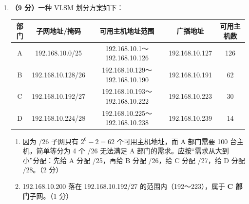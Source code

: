 \documentclass[a4paper,11pt]{article}
\begin{document}
\begin{enumerate}[start=13, label=\textbf{\arabic*.}, leftmargin=2.4em, itemsep=0.45em]
\item \textbf{（9 分）}一种 VLSM 划分方案如下：
\begin{center}\small
\begin{tabular}{ccccc}
\toprule
部门 & 子网地址/掩码 & 可用主机地址范围 & 广播地址 & 可用主机数 \\
\midrule
A & 192.168.10.0/25 & 192.168.10.1～192.168.10.126 & 192.168.10.127 & 126 \\
B & 192.168.10.128/26 & 192.168.10.129～192.168.10.190 & 192.168.10.191 & 62 \\
C & 192.168.10.192/27 & 192.168.10.193～192.168.10.222 & 192.168.10.223 & 30 \\
D & 192.168.10.224/28 & 192.168.10.225～192.168.10.238 & 192.168.10.239 & 14 \\
\bottomrule
\end{tabular}
\end{center}
\begin{enumerate}[label=（\arabic*）, leftmargin=2.2em, itemsep=1pt]
  \item 因为 /26 子网只有 $2^{6}-2=62$ 个可用主机地址，而 A 部门需要 100 台主机，简单等分为 4 个 /26 无法满足 A 部门的需求。应按“需求从大到小”分配：先给 A 分配 /25，再给 B 分配 /26，给 C 分配 /27，给 D 分配 /28。\hfill（2 分）
  \item 192.168.10.200 落在 192.168.10.192/27 的范围内（192～223），属于 \textbf{C 部门}子网。\hfill（1 分）
\end{enumerate}

\end{enumerate}

\end{document}
